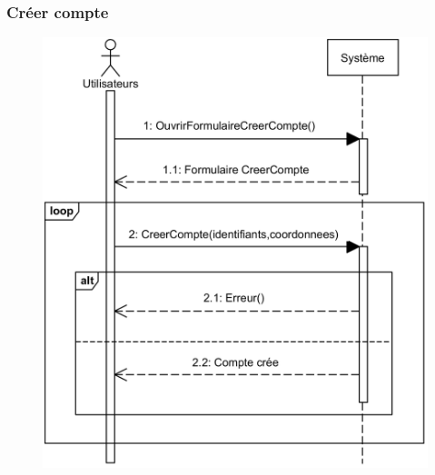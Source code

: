     \subsubsection[Créer compte]{Créer compte}
        \begin{figure}[H]
            \centering
            \includegraphics[width=115mm]{images/diagramme-de-sequence/sd-compte.png}
            \label{fig:sdCreerCompte}
        \end{figure}
\pagebreak
